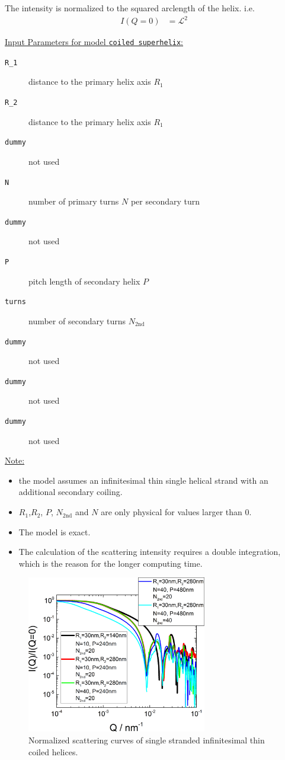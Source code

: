 The intensity is normalized to the squared arclength of the helix. i.e.
\begin{align}
I(Q=0)&=\mathcal{L}^2
\end{align}

\vspace{5mm}

\uline{Input Parameters for model \texttt{coiled superhelix}:}\\
\begin{description}
\item[\texttt{R\_1}] distance to the primary helix axis $R_1$
\item[\texttt{R\_2}] distance to the primary helix axis $R_1$
\item[\texttt{dummy}] not used
\item[\texttt{N}] number of primary turns $N$ per secondary turn
\item[\texttt{dummy}] not used
\item[\texttt{P}] pitch length of secondary helix $P$
\item[\texttt{turns}] number of secondary turns $N_\mathrm{2nd}$
\item[\texttt{dummy}] not used
\item[\texttt{dummy}] not used
\item[\texttt{dummy}] not used
\end{description}

\noindent\uline{Note:}
\begin{itemize}
\item the model assumes an infinitesimal thin single helical strand with an additional secondary coiling.
\item $R_1$,$R_2$, $P$, $N_\mathrm{2nd}$ and $N$ are only physical for values larger than 0.
\item The model is exact.
\item The calculation of the scattering intensity requires a double integration, which is the reason for the longer computing time.
\end{itemize}

\begin{figure}[htb]
\begin{center}
\includegraphics[width=0.7\textwidth]{../images/form_factor/cylindrical_obj/helix_coiledIQ.png}
\end{center}
\caption{Normalized scattering curves of single stranded infinitesimal thin coiled helices.}
\label{fig:helixcoiledIQ}
\end{figure} 